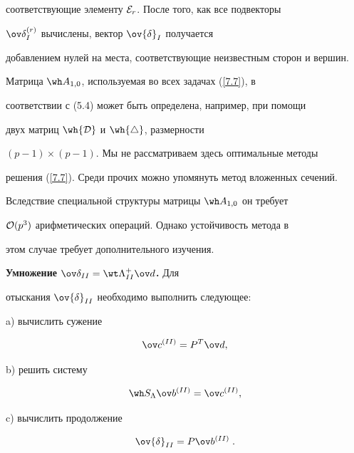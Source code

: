 соответствующие элементу ${\cal E}_r$. После того, как все подвекторы 


$\ov \delta^{(r)}_I$ вычислены, вектор $\ov {\delta}_I$ получается 


добавлением нулей на места, соответствующие неизвестным сторон и вершин.


Матрица $\wh A_{1,0}$, используемая во всех задачах (\ref{7.7}), в 


соответствии с (5.4) может быть определена, например, при помощи 


двух матриц $\wh {\cal D}$ и $\wh {\bigtriangleup}$, размерности 


$(p-1)\times(p-1)$. Мы не рассматриваем здесь оптимальные методы 


решения (\ref{7.7}). Среди прочих можно упомянуть метод вложенных сечений. 


Вследствие специальной структуры матрицы $\wh A_{1,0}$ он требует 


${\cal O}(p^3)$ арифметических операций. Однако устойчивость метода в 


этом случае требует дополнительного изучения. 





{\bf Умножение $\ov \delta_{II}=\wt \Lambda^{+}_{II} \ov d$.} Для 


отыскания $\ov {\delta}_{II}$ необходимо выполнить следующее:





a) вычислить сужение 


\begin{equation}\label{7.8}


\ov c^{(II)}=P^T \ov d,


\end{equation}





b) решить систему


\begin{equation}\label{7.9}


\wh S_{\Lambda} \ov b^{(II)}=\ov c^{(II)},


\end{equation}





c) вычислить продолжение


\begin{equation}\label{7.10}


\ov {\delta}_{II}=P\ov b^{(II)} \;.


\end{equation}





